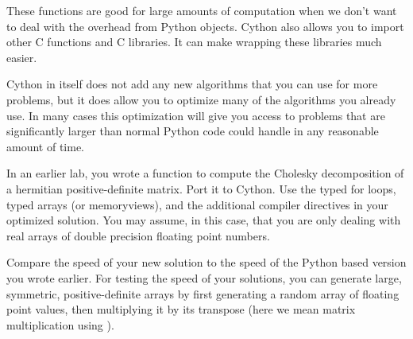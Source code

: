 These functions are good for large amounts of computation when we don't want to deal with the overhead from Python objects.
Cython also allows you to import other C functions and C libraries.
It can make wrapping these libraries much easier.

Cython in itself does not add any new algorithms that you can use for more problems, but it does allow you to optimize many of the algorithms you already use.
In many cases this optimization will give you access to problems that are significantly larger than normal Python code could handle in any reasonable amount of time.

\begin{problem}
In an earlier lab, you wrote a function to compute the Cholesky decomposition of a hermitian positive-definite matrix.
Port it to Cython.
Use the typed for loops, typed arrays (or memoryviews), and the additional compiler directives in your optimized solution.
You may assume, in this case, that you are only dealing with real arrays of double precision floating point numbers.

Compare the speed of your new solution to the speed of the Python based version you wrote earlier.
For testing the speed of your solutions, you can generate large, symmetric, positive-definite arrays by first generating a random array of floating point values, then multiplying it by its transpose (here we mean matrix multiplication using ).
\end{problem}

